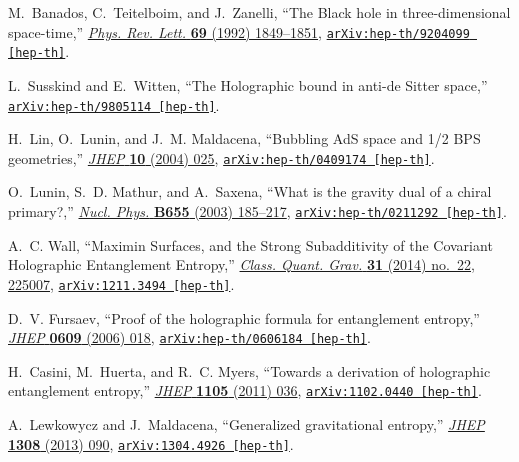\begin{thebibliography}{100}
M.~Banados, C.~Teitelboim, and J.~Zanelli, ``{The Black hole in
  three-dimensional space-time},''
  \href{http://dx.doi.org/10.1103/PhysRevLett.69.1849}{{\em Phys. Rev. Lett.}
  {\bf 69} (1992)  1849--1851},
\href{http://arxiv.org/abs/hep-th/9204099}{{\tt arXiv:hep-th/9204099
  [hep-th]}}.

L.~Susskind and E.~Witten, ``{The Holographic bound in anti-de Sitter space},''
\href{http://arxiv.org/abs/hep-th/9805114}{{\tt arXiv:hep-th/9805114
  [hep-th]}}.

H.~Lin, O.~Lunin, and J.~M. Maldacena, ``{Bubbling AdS space and 1/2 BPS
  geometries},'' \href{http://dx.doi.org/10.1088/1126-6708/2004/10/025}{{\em
  JHEP} {\bf 10} (2004)  025},
\href{http://arxiv.org/abs/hep-th/0409174}{{\tt arXiv:hep-th/0409174
  [hep-th]}}.

O.~Lunin, S.~D. Mathur, and A.~Saxena, ``{What is the gravity dual of a chiral
  primary?},'' \href{http://dx.doi.org/10.1016/S0550-3213(03)00081-6}{{\em
  Nucl. Phys.} {\bf B655} (2003)  185--217},
\href{http://arxiv.org/abs/hep-th/0211292}{{\tt arXiv:hep-th/0211292
  [hep-th]}}.

A.~C. Wall, ``{Maximin Surfaces, and the Strong Subadditivity of the Covariant
  Holographic Entanglement Entropy},''
  \href{http://dx.doi.org/10.1088/0264-9381/31/22/225007}{{\em Class. Quant.
  Grav.} {\bf 31} (2014) no.~22, 225007},
\href{http://arxiv.org/abs/1211.3494}{{\tt arXiv:1211.3494 [hep-th]}}.

D.~V. Fursaev, ``{Proof of the holographic formula for entanglement entropy},''
  \href{http://dx.doi.org/10.1088/1126-6708/2006/09/018}{{\em JHEP} {\bf 0609}
  (2006)  018},
\href{http://arxiv.org/abs/hep-th/0606184}{{\tt arXiv:hep-th/0606184
  [hep-th]}}.

H.~Casini, M.~Huerta, and R.~C. Myers, ``{Towards a derivation of holographic
  entanglement entropy},''
  \href{http://dx.doi.org/10.1007/JHEP05(2011)036}{{\em JHEP} {\bf 1105} (2011)
   036},
\href{http://arxiv.org/abs/1102.0440}{{\tt arXiv:1102.0440 [hep-th]}}.

A.~Lewkowycz and J.~Maldacena, ``{Generalized gravitational entropy},''
  \href{http://dx.doi.org/10.1007/JHEP08(2013)090}{{\em JHEP} {\bf 1308} (2013)
   090},
\href{http://arxiv.org/abs/1304.4926}{{\tt arXiv:1304.4926 [hep-th]}}.


\end{thebibliography}
